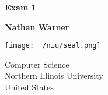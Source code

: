\documentclass{report}
\title{\Huge{}}
\author{\huge{Nathan Warner}}
\date{\huge{}}
\begin{document}
        \begin{titlepage}
       \begin{center}
           \vspace*{1cm}
    
           \textbf{Exam 1}
    
           \vspace{0.5cm}
            
                
           \vspace{1.5cm}
    
           \textbf{Nathan Warner}
    
           \vfill
                
                
           \vspace{0.8cm}
         
           \texttt{[image: ~/niu/seal.png]}
                
           Computer Science \\
           Northern Illinois University\\
           United States\\
           
                
       \end{center}
    \end{titlepage}
    \tableofcontents
\end{document}
